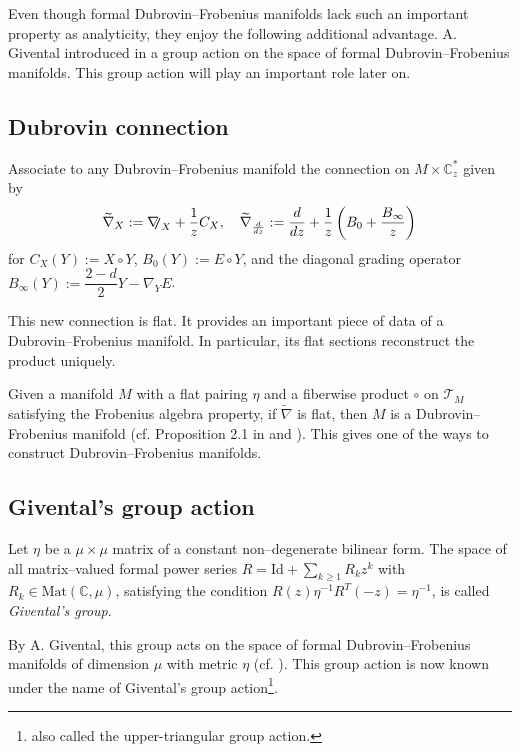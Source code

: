 \documentclass[12pt,a4paper]{amsart}
\newcommand{\CC}{{\mathbb{C}}}
\def\T{{\mathcal T}}
\newcommand{\<}{\left<}
\renewcommand{\>}{\right>}
\newcommand{\Id}{\mathrm{Id}}
\def\ns{{\nabla}\hspace{-1.2mm}{\text{\footnotesize{\bf /}}}}
\numberwithin{equation}{section}
\begin{document}
Even though formal Dubrovin--Frobenius manifolds lack such an important property as analyticity, they enjoy the following additional advantage. A. Givental introduced in \cite{G01a,G04} a group action on the space of formal Dubrovin--Frobenius manifolds. This group action will play an important role later on.

\subsection{Dubrovin connection}\label{subsection: Dubrovin connection}
Associate to any Dubrovin--Frobenius manifold the connection on $M \times \CC^\ast_z$ given by
\begin{align}\label{eq: Dubrovin connection}
    \widetilde \nabla_X := \ns_X + \frac{1}{z} C_X, \quad \widetilde \nabla_{\frac{d}{dz}} := \frac{d}{dz} + \frac{1}{z} \left( B_0 + \frac{B_\infty}{z} \right)
\end{align}
for $C_X(Y) := X \circ Y$, $B_0(Y) := E \circ Y$, and the diagonal grading operator $B_\infty(Y) := \dfrac{2-d}{2}Y - \nabla_Y E$.

This new connection is flat. It provides an important piece of data of a Dubrovin--Frobenius manifold. In particular, its flat sections reconstruct the product uniquely.

Given a manifold $M$ with a flat pairing $\eta$ and a fiberwise product $\circ$ on $\T_M$ satisfying the Frobenius algebra property, if $\widetilde \nabla$ is flat, then $M$ is a Dubrovin--Frobenius manifold (cf. Proposition 2.1 in \cite{D2} and \cite{Sa}). This gives one of the ways to construct Dubrovin--Frobenius manifolds.

\subsection{Givental's group action}\label{section: givental's action}
Let $\eta$ be a $\mu \times \mu$ matrix of a constant non--degenerate bilinear form. The space of all matrix--valued formal power series $R = \Id + \sum_{k \ge 1} R_k z^k$ with $R_k \in \mathrm{Mat}(\CC,\mu)$, satisfying the condition $R(z)\eta^{-1}R^T(-z) = \eta^{-1}$, is called {\it Givental's group}.

By A. Givental, this group acts on the space of formal Dubrovin--Frobenius manifolds of dimension $\mu$ with metric $\eta$ (cf. \cite{G01a}). This group action is now known under the name of Givental's group action\footnote{also called the upper-triangular group action.}.
\end{document}
